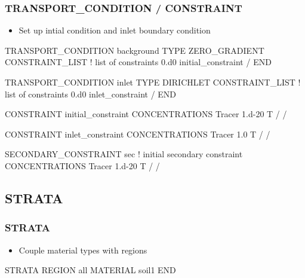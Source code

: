 \documentclass{beamer}
\newcommand\bluecomment[1]{{{\color{blue} #1}}}
\newcommand\magentacomment[1]{{{\color{magenta} #1}}}
\begin{document}
\begin{frame}\frametitle{TRANSPORT\_CONDITION / CONSTRAINT}

\begin{itemize}
  \item Set up intial condition and inlet boundary condition
\end{itemize}

{
\begin{semiverbatim}

TRANSPORT_CONDITION background
  TYPE ZERO_GRADIENT
    CONSTRAINT_LIST       \bluecomment{! list of constraints}
      0.d0 initial_constraint  
  /
END

TRANSPORT_CONDITION inlet      
  TYPE DIRICHLET
    CONSTRAINT_LIST       \bluecomment{! list of constraints}
      0.d0 inlet_constraint  
  /
END
\end{semiverbatim}
}

\newpage
{\small
\begin{semiverbatim}
CONSTRAINT initial_constraint
  CONCENTRATIONS
    Tracer  1.d-20  T 
  /
/

CONSTRAINT inlet_constraint
  CONCENTRATIONS
    Tracer  1.0  T
  /
/

\magentacomment{SECONDARY_CONSTRAINT sec    \bluecomment{! initial secondary constraint}
  CONCENTRATIONS
    Tracer  1.d-20  T 
  /
/}
\end{semiverbatim}
}

\end{frame}

\subsection{STRATA}

\begin{frame}[fragile]\frametitle{STRATA}

\begin{itemize}
\item Couple material types with regions
\end{itemize}

\begin{semiverbatim}
STRATA
  REGION all
  MATERIAL soil1
END

\end{semiverbatim}

\end{frame}


\end{document}
